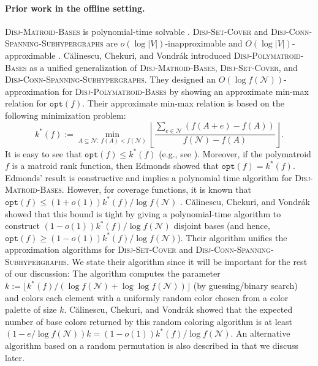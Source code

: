\documentclass[11pt]{article}
\theoremstyle{definition}
\newcommand{\calN}{{\mathcal{N}}}
\newcommand{\DPB}{\textsc{Disj-Polymatroid-Bases}\xspace}
\newcommand{\DSC}{\textsc{Disj-Set-Cover}\xspace}
\newcommand{\DMB}{\textsc{Disj-Matroid-Bases}\xspace}
\newcommand{\DCSS}{\textsc{Disj-Conn-Spanning-Subhypergraphs}\xspace}
\newcommand{\opt}{\texttt{opt}}
\begin{document}
\paragraph{Prior work in the offline setting.}
\DMB is polynomial-time solvable \cite{Edm65}. \DSC and \DCSS are $o(\log |V|)$-inapproximable and $O(\log|V|)$-approximable \cite{FHKS02, CS07}. 
C{\u{a}}linescu, Chekuri, and Vondr\'{a}k \cite{CCV09} introduced \DPB as a unified generalization of \DMB, \DSC, and \DCSS. They designed an $O(\log{f(\calN)})$-approximation for \DPB by showing an approximate min-max relation for $\opt(f)$. Their approximate min-max relation is based on the following minimization problem:
\[
k^*(f):= \min_{A\subseteq \calN:\ f(A)<f(\calN)}\left\lfloor \frac{\sum_{e\in \calN}(f(A+e)-f(A))}{f(\calN)-f(A)}\right\rfloor. 
\]
It is easy to see that $\opt(f)\le k^*(f)$ (e.g., see \cite{CCV09}). 
Moreover, if the polymatroid $f$ is a matroid rank function, then Edmonds \cite{Edm65} showed that $\opt(f)=k^*(f)$. Edmonds' result is constructive and implies a polynomial time algorithm for \DMB. 
However, for coverage functions, it is known that $\opt(f)\le(1+o(1))k^*(f)/\log{f(\calN)}$ \cite{FHKS02}. C{\u{a}}linescu, Chekuri, and Vondr\'{a}k showed that this bound is tight by giving a polynomial-time algorithm to construct $(1-o(1))k^*(f)/\log{f(\calN)}$ disjoint bases (and hence, $ \opt(f)\ge (1-o(1))k^*(f)/\log{f(\calN)}$). 
Their algorithm unifies the approximation algorithms for \DSC \cite{FHKS02} and \DCSS \cite{CS07}. 
We state their algorithm since it will be important for the rest of our discussion:  
The algorithm computes the parameter $k:=\lfloor k^*(f)/(\log{f(\calN)}+\log{\log{f(\calN)}})\rfloor$ (by guessing/binary search) 
and colors each element with a uniformly random color chosen from a color palette of size $k$. C{\u{a}}linescu, Chekuri, and Vondr\'{a}k showed that the expected number of base colors returned by this random coloring algorithm 
is at least $(1-e/\log{f(\calN)})k = (1-o(1))k^*(f)/\log{f(\calN)}$. An alternative algorithm based on a random permutation is also described in \cite{CCV09} that we discuss later. 
\iffalse
It picks a uniform random ordering of the elements and 
partitions them into at least $k$ parts by grouping together consecutive elements of $\lfloor |N |/k \rfloor$ each (except perhaps for the last group); each part is given a unique color. 
\cite{CCV09} show that the expected number of base colors 
is at least $(1-e/\ln{f(\calN)})k = (1-o(1))k^*(f)/\log{f(\calN)}$. 
We note that the following variant of the algorithm achieves the same guarantee (see Lemma \ref{lemma:sampling-property}): 
Process elements in an arbitrary order and color each element with a uniformly random color chosen from a color palette of size $k$. Both variants of the algorithm will be useful for the subsequent discussion on the online setting. 
\fi
\end{document}
